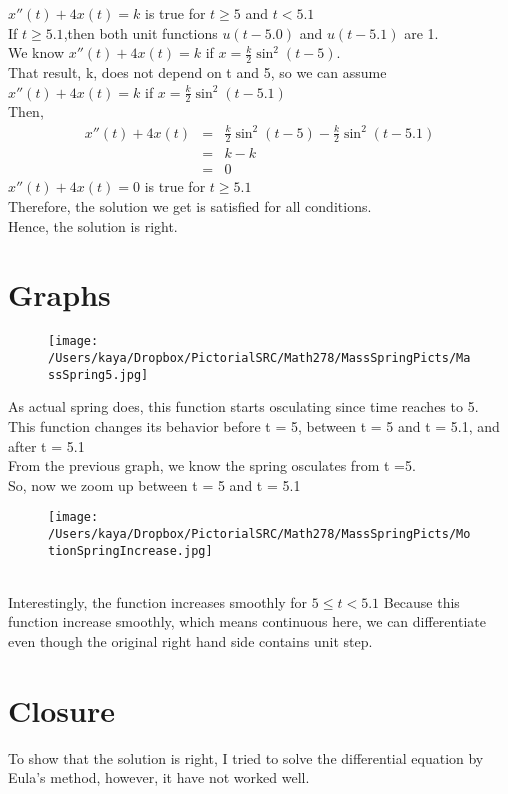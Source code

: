 \documentclass[12pt,letterpaper,fleqn]{article}
\begin{document}
$x''(t) + 4x(t) = k $ is true for $t \geq 5 $ and $t < 5.1$ \\
If $t \geq 5.1$,then both unit functions $u(t-5.0)$ and $u(t-5.1)$ are 1.\\
We know $x''(t) + 4x(t) = k $ if $x = \frac{k}{2}\sin^2(t-5)$.\\
That result, k, does not depend on t and 5, so we can assume $x''(t) + 4x(t) = k $ if $x = \frac{k}{2}\sin^2(t-5.1)$\\
Then,
\begin{eqnarray*}
x''(t) + 4x(t) &=& \frac{k}{2}\sin^2(t-5) - \frac{k}{2}\sin^2(t-5.1)\\
&=& k - k \\
&=& 0
\end{eqnarray*}
$x''(t) + 4x(t) = 0$ is true for $t \geq 5.1 $\\
Therefore, the solution we get is satisfied for all conditions.\\
Hence, the solution is right.
\section{Graphs}
\begin{figure}[h]
\begin{center}
\texttt{[image: /Users/kaya/Dropbox/PictorialSRC/Math278/MassSpringPicts/MassSpring5.jpg]}
\end{center}
\end{figure}
As actual spring does, this function starts osculating since time reaches to 5.\\
This function changes its behavior before t = 5, between t = 5 and t = 5.1, and after t = 5.1 \\
From the previous graph, we know the spring osculates from t =5.\\
So, now we zoom up between t = 5 and t = 5.1\\
\begin{figure}[htbp]
\begin{center}
\texttt{[image: /Users/kaya/Dropbox/PictorialSRC/Math278/MassSpringPicts/MotionSpringIncrease.jpg]}
\end{center}
\end{figure}\\
Interestingly, the function increases smoothly for $5 \leq t < 5.1$ 
Because this function increase smoothly, which means continuous here, we can differentiate even though the original right hand side contains unit step.
\section{Closure}
To show that the solution is right, I tried to solve the differential equation by Eula's method, however, it have not worked well.
\end{document}

